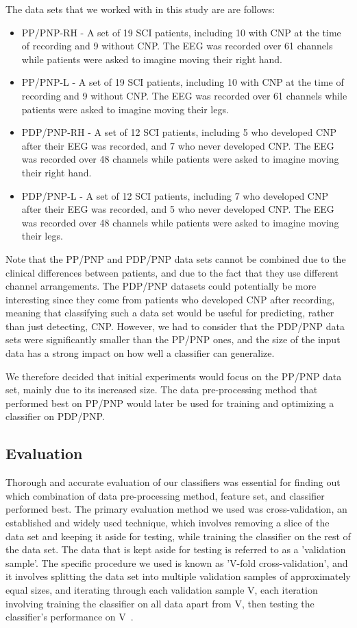 \documentclass{mpaper}
\begin{document}
The data sets that we worked with in this study are are follows:
\begin{itemize}
    \item PP/PNP-RH - A set of 19 SCI patients, including 10 with CNP at the time of recording and 9 without CNP. The EEG was recorded over 61 channels while patients were asked to imagine moving their right hand.
    \item PP/PNP-L - A set of 19 SCI patients, including 10 with CNP at the time of recording and 9 without CNP. The EEG was recorded over 61 channels while patients were asked to imagine moving their legs.
    \item PDP/PNP-RH - A set of 12 SCI patients, including 5 who developed CNP after their EEG was recorded, and 7 who never developed CNP. The EEG was recorded over 48 channels while patients were asked to imagine moving their right hand.
    \item PDP/PNP-L - A set of 12 SCI patients, including 7 who developed CNP after their EEG was recorded, and 5 who never developed CNP. The EEG was recorded over 48 channels while patients were asked to imagine moving their legs.
\end{itemize}

Note that the PP/PNP and PDP/PNP data sets cannot be combined due to the clinical differences between patients, and due to the fact that they use different channel arrangements. The PDP/PNP datasets could potentially be more interesting since they come from patients who developed CNP after recording, meaning that classifying such a data set would be useful for predicting, rather than just detecting, CNP. However, we had to consider that the PDP/PNP data sets were significantly smaller than the PP/PNP ones, and the size of the input data has a strong impact on how well a classifier can generalize.

We therefore decided that initial experiments would focus on the PP/PNP data set, mainly due to its increased size. The data pre-processing method that performed best on PP/PNP would later be used for training and optimizing a classifier on PDP/PNP.

\subsection{Evaluation}
\label{model-eval}

Thorough and accurate evaluation of our classifiers was essential for finding out which combination of data pre-processing method, feature set, and classifier performed best. The primary evaluation method we used was cross-validation, an established and widely used technique, which involves removing a slice of the data set and keeping it aside for testing, while training the classifier on the rest of the data set. The data that is kept aside for testing is referred to as a 'validation sample'. The specific procedure we used is known as 'V-fold cross-validation', and it involves splitting the data set into multiple validation samples of approximately equal sizes, and iterating through each validation sample V, each iteration involving training the classifier on all data apart from V, then testing the classifier's performance on V~\cite{arlot_survey_2010}.
\end{document}
